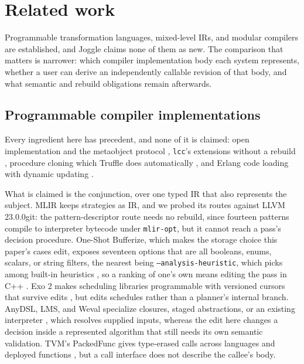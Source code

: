 \documentclass[sigplan,anonymous,review]{acmart}
\begin{document}
\section{Related work}
Programmable transformation languages, mixed-level IRs, and modular compilers
are established, and Joggle claims none of them as new. The comparison that
matters is narrower: which compiler implementation body each system represents,
whether a user can derive an independently callable revision of that body, and
what semantic and rebuild obligations remain afterwards.

\subsection{Programmable compiler implementations}
\label{sec:related-transform}
Every ingredient here has precedent, and none of it is claimed: open
implementation and the metaobject protocol
\cite{lamping1992open,kiczales1997open,chiba1995mop}, {\tt lcc}'s extensions
without a rebuild \cite{engler1999interface}, procedure cloning
\cite{cooper1993cloning} which Truffle does automatically
\cite{wurthinger2017practical}, and Erlang code loading with dynamic updating
\cite{erlangCodeLoading,hicks2005dynamic}.

What is claimed is the conjunction, over one typed IR that also represents the
subject. MLIR keeps strategies as IR, and we probed its routes against LLVM
23.0.0git: the pattern-descriptor route needs no rebuild, since fourteen patterns
compile to interpreter bytecode under \texttt{mlir-opt}, but it cannot reach a
pass's decision procedure. One-Shot Bufferize, which makes the storage choice
this paper's cases edit, exposes seventeen options that are all booleans, enums,
scalars, or string filters, the nearest being \texttt{--analysis-heuristic},
which picks among built-in heuristics
\cite{lucke2025transform,mlirTransformDocs,mlirPdl,mlirBufferizationDocs}, so a
ranking of one's own means editing the pass in C++ \cite{mlirTransformTutorial}.
Exo 2 makes scheduling libraries programmable with versioned cursors that survive
edits \cite{ikarashi2024exo2}, but edits schedules rather than a planner's
internal branch. AnyDSL, LMS, and Weval specialize closures, staged abstractions, or an existing
interpreter \cite{leissa2018anydsl,rompf2016lms,fallin2025weval}, which resolves
supplied inputs, whereas the edit here changes a decision inside a represented
algorithm that still needs its own semantic validation. TVM's PackedFunc gives
type-erased calls across languages and deployed functions \cite{tvmRuntimeDocs},
but a call interface does not describe the callee's body.
\end{document}

